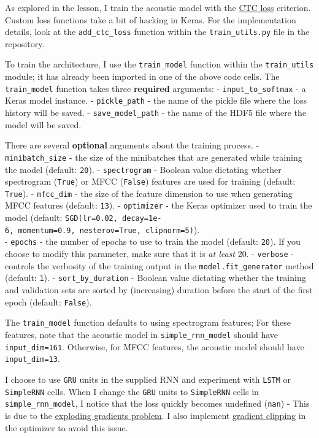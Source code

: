 \documentclass[11pt]{article}
\begin{document}
    As explored in the lesson, I train the acoustic model with the
\href{http://www.cs.toronto.edu/~graves/icml_2006.pdf}{CTC loss}
criterion. Custom loss functions take a bit of hacking in Keras. For the
implementation details, look at the \texttt{add\_ctc\_loss} function
within the \texttt{train\_utils.py} file in the repository.

To train the architecture, I use the \texttt{train\_model} function
within the \texttt{train\_utils} module; it has already been imported in
one of the above code cells. The \texttt{train\_model} function takes
three \textbf{required} arguments: - \texttt{input\_to\_softmax} - a
Keras model instance. - \texttt{pickle\_path} - the name of the pickle
file where the loss history will be saved. - \texttt{save\_model\_path}
- the name of the HDF5 file where the model will be saved.

There are several \textbf{optional} arguments about the training
process. - \texttt{minibatch\_size} - the size of the minibatches that
are generated while training the model (default: \texttt{20}). -
\texttt{spectrogram} - Boolean value dictating whether spectrogram
(\texttt{True}) or MFCC (\texttt{False}) features are used for training
(default: \texttt{True}). - \texttt{mfcc\_dim} - the size of the feature
dimension to use when generating MFCC features (default: \texttt{13}). -
\texttt{optimizer} - the Keras optimizer used to train the model
(default:
\texttt{SGD(lr=0.02,\ decay=1e-6,\ momentum=0.9,\ nesterov=True,\ clipnorm=5)}).\\
- \texttt{epochs} - the number of epochs to use to train the model
(default: \texttt{20}). If you choose to modify this parameter, make
sure that it is \emph{at least} 20. - \texttt{verbose} - controls the
verbosity of the training output in the \texttt{model.fit\_generator}
method (default: \texttt{1}). - \texttt{sort\_by\_duration} - Boolean
value dictating whether the training and validation sets are sorted by
(increasing) duration before the start of the first epoch (default:
\texttt{False}).

The \texttt{train\_model} function defaults to using spectrogram
features; For these features, note that the acoustic model in
\texttt{simple\_rnn\_model} should have \texttt{input\_dim=161}.
Otherwise, for MFCC features, the acoustic model should have
\texttt{input\_dim=13}.

I choose to use \texttt{GRU} units in the supplied RNN and experiment
with \texttt{LSTM} or \texttt{SimpleRNN} cells. When I change the
\texttt{GRU} units to \texttt{SimpleRNN} cells in
\texttt{simple\_rnn\_model}, I notice that the loss quickly becomes
undefined (\texttt{nan}) - This is due to the
\href{http://www.wildml.com/2015/10/recurrent-neural-networks-tutorial-part-3-backpropagation-through-time-and-vanishing-gradients/}{exploding
gradients problem}. I also implement
\href{https://arxiv.org/pdf/1211.5063.pdf}{gradient clipping} in the
optimizer to avoid this issue.
\end{document}
